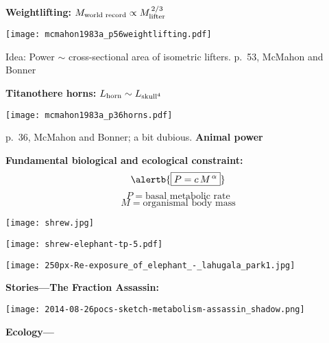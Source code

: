 \textbf{Weightlifting: $M_{\textnormal{world record}} \propto M_{\textnormal{lifter}}^{\, 2/3}$}
\begin{marginfigure}[]
  \texttt{[image: mcmahon1983a\_p56weightlifting.pdf]}
\end{marginfigure}


Idea: Power $\sim$ cross-sectional area of isometric lifters.
\small{p.\ 53, McMahon and Bonner\cite{mcmahon1983a}}

\textbf{Titanothere horns: $L_{\textnormal{horn}} \sim L_{\textnormal{skull}^4}$}

\begin{marginfigure}[]
  \texttt{[image: mcmahon1983a\_p36horns.pdf]}    
\end{marginfigure}

\small{p.\ 36, McMahon and Bonner\cite{mcmahon1983a}; a bit dubious.}
\textbf{Animal power}

\textbf{Fundamental biological and ecological constraint:}
$$
\alertb{\boxed{P = c\, M^{\, \alpha}}}
$$
$$P = \mbox{basal metabolic rate}$$
$$M = \mbox{organismal body mass}$$


\begin{marginfigure}[]
  \texttt{[image: shrew.jpg]}
\end{marginfigure}


\begin{marginfigure}[]
  \texttt{[image: shrew-elephant-tp-5.pdf]}
\end{marginfigure}


\begin{marginfigure}[]
  \texttt{[image: 250px-Re-exposure\_of\_elephant\_-\_lahugala\_park1.jpg]}
\end{marginfigure}


\textbf{Stories---The Fraction Assassin:}

\begin{marginfigure}[]
  \texttt{[image: 2014-08-26pocs-sketch-metabolism-assassin\_shadow.png]}
\end{marginfigure}

\textbf{Ecology---}

